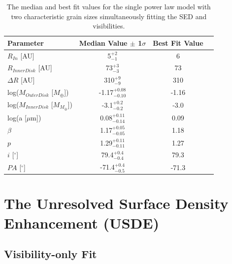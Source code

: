 \begin{table}
\begin{center}
    \def\arraystretch{1.1}%
    \begin{tabular}{l*{2}{c}r}
    \hline
    Parameter & Median Value $\pm$ 1$\sigma$ & Best Fit Value \\ \hline
     $R_{In}$  [AU] & 5$^{+2}_{-1}$ & 6\\  
     $R_{Inner Disk}$ [AU] & 73$^{+3}_{-3}$ & 73\\      
     $\Delta R$ [AU] & 310$^{+9}_{-9}$ & 310\\ 
     log($M_{Outer Disk}$ [$M_{\oplus}$]) & -1.17$^{+0.08}_{-0.10}$ & -1.16 \\
     log($M_{Inner Disk}$ [$M_{M_{\oplus}}$]) & -3.1$^{+0.2}_{-0.2}$ & -3.0 \\     
     log(a [$\mu$m]) & 0.08$^{+0.11}_{-0.14}$ & 0.09\\ 
     $\beta$ & 1.17$^{+0.05}_{-0.05}$ & 1.18\\ 
     $p$ & 1.29$^{+0.11}_{-0.11}$ & 1.27\\ 
     $i$ [$^\circ$] & 79.4$^{+0.4}_{-0.4}$ & 79.3 \\ 
     $PA$ [$^\circ$] & -71.4$^{+0.4}_{-0.5}$ & -71.3\\
    \hline
    \end{tabular}
\end{center}
\caption{The median and best fit values for the single power law model with two characteristic grain sizes simultaneously fitting the SED and visibilities.}
\label{tab:49CET_nOBAG_Table}
\end{table}



\section{The Unresolved Surface Density Enhancement (USDE)}
\label{USDE}

\subsection{Visibility-only Fit}
\label{USDE_Vis}

